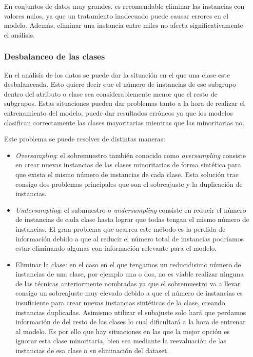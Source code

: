 En conjuntos de datos muy grandes, es recomendable eliminar las instancias con valores nulos, ya que un tratamiento inadecuado puede causar errores en el modelo. Además, eliminar una instancia entre miles no afecta significativamente el análisis.

\subsubsection{Desbalanceo de las clases}

En el análisis de los datos se puede dar la situación en el que una clase este desbalanceada. Esto quiere decir que el número de instancias de ese subgrupo dentro del atributo o clase sea considerablemente menor que el resto de subgrupos. Estas situaciones pueden dar problemas tanto a la hora de realizar el entrenamiento del modelo, puede dar resultados erróneos ya que los modelos clasifican correctamente las clases mayoritarias mientras que las minoritarias no.

Este problema se puede resolver de distintas maneras:
\begin{itemize}
\item \textit{Oversampling}: el sobremuestro también conocido como \textit{oversampling} consiste en crear nuevas instancias de las clases minoritarias de forma sintética para que exista el mismo número de instancias de cada clase. Esta solución trae consigo dos problemas principales que son el sobreajuste y la duplicación de instancias.
\item \textit{Undersampling}: el submuestro o \textit{undersampling} consiste en reducir el número de instancias de cada clase hasta lograr que todas tengan el mismo número de instancias. El gran problema que acarrea este método es la perdida de información debido a que al reducir el número total de instancias podríamos estar eliminando algunas con información relevante para el modelo.
\item Eliminar la clase: en el caso en el que tengamos un reducidisimo número de instancias de una clase, por ejemplo una o dos, no es viable realizar ninguna de las técnicas anteriormente nombradas ya que el sobremuestro va a llevar consigo un sobreajuste muy elevado debido a que el número de instancias es insuficiente para crear nuevas instancias sintéticas de la clase, creando instancias duplicadas. Asimismo utilizar el subajuste solo hará que perdamos información de del resto de las clases lo cual dificultará a la hora de entrenar al modelo. Es por ello que hay situaciones en las que la mejor opción es ignorar esta clase minoritaria, bien sea mediante la reevaluación de las instancias de esa clase o su eliminación del dataset.
\end{itemize}

